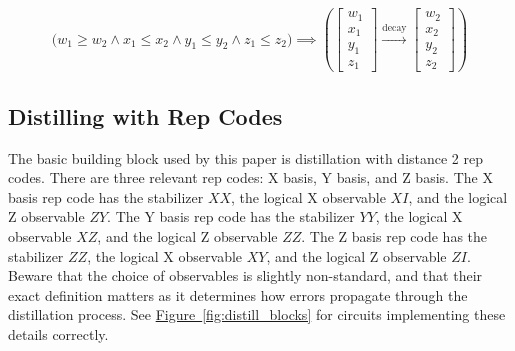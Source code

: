 \documentclass[onecolumn,unpublished,a4paper]{quantumarticle}
\theoremstyle{definition}
\theoremstyle{definition}
\theoremstyle{definition}
\newcommand{\fig}[1]{\hyperref[fig:#1]{Figure~\ref*{fig:#1}}}
\begin{document}
\begin{equation}
\Big(w_1 \geq w_2 \land x_1 \leq x_2 \land y_1 \leq y_2 \land z_1 \leq z_2\Big)
\implies
\left(\begin{bmatrix}w_1\\x_1\\y_1\\z_1\end{bmatrix}
\xrightarrow{\text{decay}}
\begin{bmatrix}w_2\\x_2\\y_2\\z_2\end{bmatrix}\right)
\end{equation}

\subsection{Distilling with Rep Codes}

The basic building block used by this paper is distillation with distance 2 rep codes.
There are three relevant rep codes: X basis, Y basis, and Z basis.
The X basis rep code has the stabilizer $XX$, the logical X observable $XI$, and the logical Z observable $ZY$.
The Y basis rep code has the stabilizer $YY$, the logical X observable $XZ$, and the logical Z observable $ZZ$.
The Z basis rep code has the stabilizer $ZZ$, the logical X observable $XY$, and the logical Z observable $ZI$.
Beware that the choice of observables is slightly non-standard, and that their exact definition matters as it determines how errors propagate through the distillation process.
See \fig{distill_blocks} for circuits implementing these details correctly.
\end{document}

